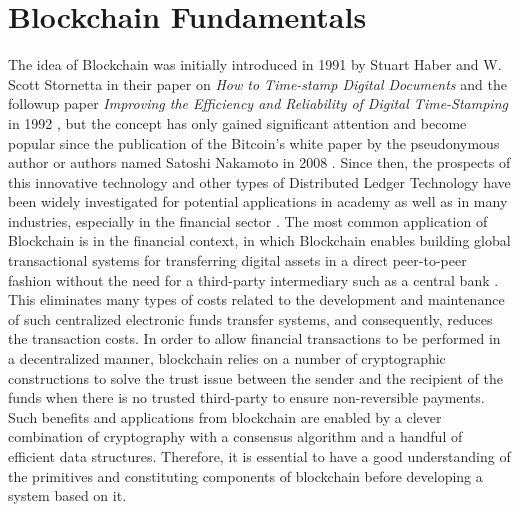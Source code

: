 



\section{Blockchain Fundamentals} \label{sec:blockchainfund}
The idea of Blockchain was initially introduced in 1991 by Stuart Haber and W. Scott Stornetta in their paper on \textit{How to Time-stamp Digital Documents} \cite{haber1990time} and the followup paper \textit{Improving the Efficiency and Reliability of Digital Time-Stamping} in 1992 \cite{bayer1993improving}, but the concept has only gained significant attention and become popular since the publication of the Bitcoin's white paper by the pseudonymous author or authors named Satoshi Nakamoto in 2008 \cite{satoshi2008peer}. Since then, the prospects of this innovative technology and other types of Distributed Ledger Technology have been widely investigated for potential applications in academy as well as in many industries, especially in the financial sector \cite{swan2017anticipating}. The most common application of Blockchain is in the financial context, in which Blockchain enables building global transactional systems for transferring digital assets in a direct peer-to-peer fashion without the need for a third-party intermediary such as a central bank \cite{swan2015blockchain}. This eliminates many types of costs related to the development and maintenance of such centralized electronic funds transfer systems, and consequently, reduces the transaction costs. In order to allow financial transactions to be performed in a decentralized manner, blockchain relies on a number of cryptographic constructions to solve the trust issue between the sender and the recipient of the funds when there is no trusted third-party to ensure non-reversible payments. Such benefits and applications from blockchain are enabled by a clever combination of cryptography with a consensus algorithm and a handful of efficient data structures. Therefore, it is essential to have a good understanding of the primitives and constituting components of blockchain before developing a system based on it.

